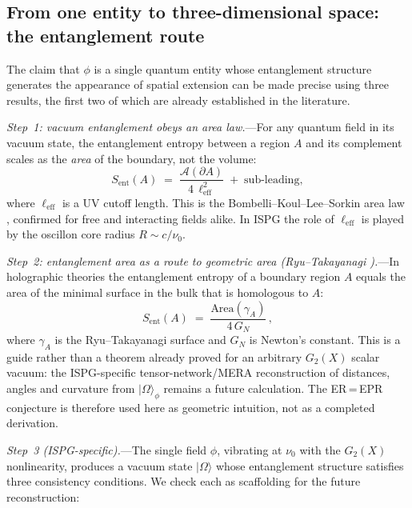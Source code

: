 \documentclass[11pt]{article}
\begin{document}
\subsection{From one entity to three-dimensional
space: the entanglement route}
\label{sec:entanglement_geometry}

The claim that $\phi$ is a single quantum
entity whose entanglement structure generates
the appearance of spatial extension can be
made precise using three results, the first
two of which are already established in the
literature.

\textit{Step~1: vacuum entanglement obeys an
area law.}---For any quantum field in its
vacuum state, the entanglement entropy between
a region $A$ and its complement scales as the
\emph{area} of the boundary, not the volume:
\begin{equation}\label{eq:area_law}
  S_{\mathrm{ent}}(A)
  \;=\; \frac{\mathcal{A}(\partial A)}
  {4\,\ell_{\mathrm{eff}}^2}
  \;+\; \text{sub-leading},
\end{equation}
where $\ell_{\mathrm{eff}}$ is a UV cutoff
length.  This is the Bombelli--Koul--Lee--Sorkin
area law \cite{Bombelli1986}, confirmed for free and
interacting fields alike.  In ISPG the role of
$\ell_{\mathrm{eff}}$ is played by the oscillon
core radius $R \sim c / \nu_0$.

\textit{Step~2: entanglement area as a route to
geometric area (Ryu--Takayanagi
\cite{RyuTakayanagi2006,NishiokaTakayanagi2009}).}---In holographic
theories \cite{Maldacena1998} the entanglement entropy of a boundary
region $A$ equals the area of the minimal
surface in the bulk that is homologous to $A$:
\begin{equation}\label{eq:RT}
  S_{\mathrm{ent}}(A)
  \;=\; \frac{\text{Area}(\gamma_A)}{4\,G_N}\,,
\end{equation}
where $\gamma_A$ is the Ryu--Takayanagi surface
and $G_N$ is Newton's constant.
This is a guide rather than a theorem already
proved for an arbitrary $G_2(X)$ scalar vacuum:
the ISPG-specific tensor-network/MERA
reconstruction of distances, angles and curvature
from $|\Omega\rangle_\phi$ remains a future
calculation.  The ER\,=\,EPR conjecture
\cite{MaldacenaSusskind2013} is therefore used
here as geometric intuition, not as a completed
derivation.

\textit{Step~3 (ISPG-specific).}---The single
field $\phi$, vibrating at $\nu_0$ with the
$G_2(X)$ nonlinearity, produces a vacuum state
$|\Omega\rangle$ whose entanglement structure
satisfies three consistency conditions.  We check
each as scaffolding for the future reconstruction:
\end{document}

